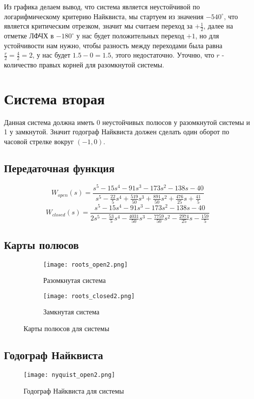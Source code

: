 Из графика делаем вывод, что система является неустойчивой по логарифмическому критерию Найквиста, 
мы стартуем из значения $-540^\circ$, что является критическим отрезком, значит мы считаем переход за $+\frac{1}{2}$, 
далее на отметке ЛФЧХ в $-180^\circ $ у нас будет положительных переход $+1$, но для устойчивости нам нужно, чтобы разность между переходами была равна $\frac{r}{2} = \frac{4}{2} = 2$, у нас будет $1.5 - 0 = 1.5$, этого недостаточно.
Уточню, что $r$ - количество правых корней для разомкнутой системы.
\newpage

\section{Система вторая}
Данная система должна иметь 0 неустойчивых полюсов у разомкнутой системы и 1 у замкнутой. 
Значит годограф Найквиста должен сделать один оборот по часовой стрелке вокруг $(-1, 0)$.
\subsection{Передаточная функция}
$$
W_{open}(s) = \frac{s^5 -15s^4 -91s^3 -173s^2 -138s-40}{s^5 -\frac{22}{5}s^4+\frac{519}{50}s^3+\frac{891}{50}s^2+\frac{476}{25}s+\frac{41}{5}}
$$
$$
W_{closed}(s) = \frac{s^5 -15s^4 -91s^3 -173s^2 -138s-40}{2s^5 -\frac{53}{5}s^4-\frac{4031}{50}s^3-\frac{7759}{50}s^2-\frac{2974}{25}s-\frac{159}{5}}
$$
\subsection{Карты полюсов}
\begin{figure}[h]
  \begin{subfigure}{0.5\textwidth}
    \texttt{[image: roots\_open2.png]} 
    \caption{Разомкнутая система}
  \end{subfigure}
  \begin{subfigure}{0.5\textwidth}
    \texttt{[image: roots\_closed2.png]}
    \caption{Замкнутая система}
  \end{subfigure}
  \caption{Карты полюсов для системы}
\end{figure}

\newpage
\subsection{Годограф Найквиста}
\begin{figure}[ht]
    \centering
    \texttt{[image: nyquist\_open2.png]}
    \caption{Годограф Найквиста для системы}
  \end{figure}

